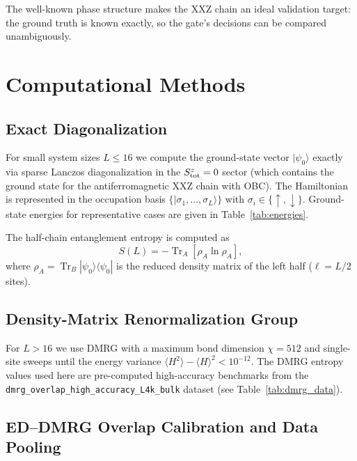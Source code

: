 \documentclass[11pt,letterpaper]{article}
\newcommand{\Tr}{\operatorname{Tr}}
\begin{document}
The well-known phase structure makes the XXZ chain an ideal validation target:
the ground truth is known exactly, so the gate's decisions can be compared
unambiguously.

\section{Computational Methods}
\label{sec:methods}

\subsection{Exact Diagonalization}

For small system sizes $L \le 16$ we compute the ground-state vector
$|\psi_0\rangle$ exactly via sparse Lanczos diagonalization in the
$S^z_{\rm tot} = 0$ sector (which contains the ground state for the
antiferromagnetic XXZ chain with OBC).  The Hamiltonian is represented in
the occupation basis $\{|\sigma_1,\ldots,\sigma_L\rangle\}$ with
$\sigma_i \in \{\uparrow,\downarrow\}$.  Ground-state energies for
representative cases are given in Table~\ref{tab:energies}.

The half-chain entanglement entropy is computed as
\begin{equation}
  S(L) = -\Tr_A[\rho_A \ln \rho_A],
  \label{eq:vne}
\end{equation}
where $\rho_A = \Tr_B |\psi_0\rangle\langle\psi_0|$ is the reduced density
matrix of the left half ($\ell = L/2$ sites).

\subsection{Density-Matrix Renormalization Group}

For $L > 16$ we use DMRG with a maximum bond dimension $\chi = 512$ and
single-site sweeps until the energy variance $\langle H^2\rangle - \langle H\rangle^2 < 10^{-12}$.
The DMRG entropy values used here are pre-computed high-accuracy benchmarks
from the \texttt{dmrg\_overlap\_high\_accuracy\_L4k\_bulk} dataset
(see Table~\ref{tab:dmrg_data}).

\subsection{ED--DMRG Overlap Calibration and Data Pooling}
\end{document}
